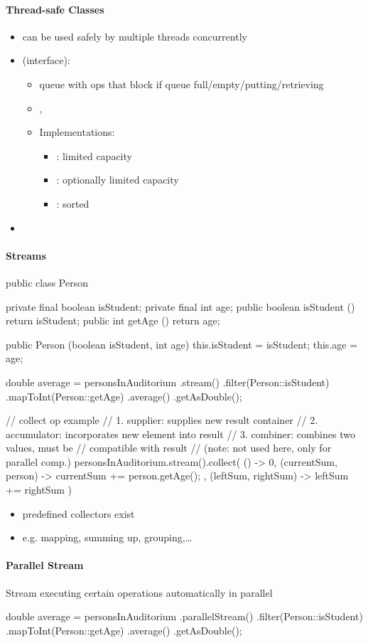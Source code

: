 \paragraph{Thread-safe Classes}
\begin{itemize}
  \item can be used safely by multiple threads concurrently
  \item {} (interface):
  \begin{itemize}
    \item queue with ops that block if queue full/empty/putting/retrieving
    \item {}, 
    \item Implementations:
    \begin{itemize}
      \item {}: limited capacity
      \item {}: optionally limited capacity
      \item {}: sorted
    \end{itemize}
  \end{itemize}
  \item {}
\end{itemize}

\paragraph{Streams}
\begin{java}
  public class Person {
    private final boolean isStudent;
    private final int age;
    public boolean isStudent () { return isStudent; }
    public int getAge () { return age; }

    public Person (boolean isStudent, int age) {
      this.isStudent = isStudent;
      this.age = age;
    }
  }

  double average = personsInAuditorium
    .stream()
    .filter(Person::isStudent)
    .mapToInt(Person::getAge)
    .average()
    .getAsDouble();

  // collect op example
  // 1. supplier: supplies new result container
  // 2. accumulator: incorporates new element into result
  // 3. combiner: combines two values, must be
  //    compatible with result
  //    (note: not used here, only for parallel comp.)
  personsInAuditorium.stream().collect(
    () -> 0,
    (currentSum, person) -> { currentSum += person.getAge(); },
    (leftSum, rightSum) -> { leftSum += rightSum }
  )
\end{java}
\begin{itemize}
  \item predefined collectors exist
  \item e.g. mapping, summing up, grouping,\dots
\end{itemize}

\paragraph{Parallel Stream}
Stream executing certain operations automatically in parallel
\begin{java}
  double average = personsInAuditorium
    .parallelStream()
    .filter(Person::isStudent)
    .mapToInt(Person::getAge)
    .average()
    .getAsDouble();
\end{java}